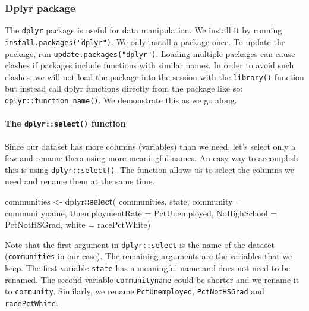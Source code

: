 \documentclass[]{article}
\newenvironment{Shaded}{\begin{snugshade}}{\end{snugshade}}
\newcommand{\DataTypeTok}[1]{\textcolor[rgb]{0.13,0.29,0.53}{#1}}
\newcommand{\KeywordTok}[1]{\textcolor[rgb]{0.13,0.29,0.53}{\textbf{#1}}}
\newcommand{\NormalTok}[1]{#1}
\newcommand{\OperatorTok}[1]{\textcolor[rgb]{0.81,0.36,0.00}{\textbf{#1}}}
\newcommand{\StringTok}[1]{\textcolor[rgb]{0.31,0.60,0.02}{#1}}
\let\oldparagraph\paragraph
\renewcommand{\paragraph}[1]{\oldparagraph{#1}\mbox{}}
\begin{document}
\hypertarget{dplyr-package}{%
\subsubsection{Dplyr package}\label{dplyr-package}}

The \texttt{dplyr} package is useful for data manipulation. We install it by running \texttt{install.packages("dplyr")}. We only install a package once. To update the package, run \texttt{update.packages("dplyr")}. Loading multiple packages can cause clashes if packages include functions with similar names. In order to avoid such clashes, we will not load the package into the session with the \texttt{library()} function but instead call dplyr functions directly from the package like so: \texttt{dplyr::function\_name()}. We demonstrate this as we go along.

\hypertarget{the-dplyrselect-function}{%
\paragraph{\texorpdfstring{The \texttt{dplyr::select()} function}{The dplyr::select() function}}\label{the-dplyrselect-function}}

Since our dataset has more columns (variables) than we need, let's select only a few and rename them using more meaningful names. An easy way to accomplish this is using \texttt{dplyr::select()}. The function allows us to select the columns we need and rename them at the same time.

\begin{Shaded}
\begin{Highlighting}[]
\NormalTok{communities <-}\StringTok{ }\NormalTok{dplyr}\OperatorTok{::}\KeywordTok{select}\NormalTok{(}
\NormalTok{  communities, }
\NormalTok{  state, }
  \DataTypeTok{community =}\NormalTok{ communityname, }
  \DataTypeTok{UnemploymentRate =}\NormalTok{ PctUnemployed, }
  \DataTypeTok{NoHighSchool =}\NormalTok{ PctNotHSGrad,}
  \DataTypeTok{white =}\NormalTok{ racePctWhite)}
\end{Highlighting}
\end{Shaded}

Note that the first argument in \texttt{dplyr::select} is the name of the dataset (\texttt{communities} in our case). The remaining arguments are the variables that we keep. The first variable \texttt{state} has a meaningful name and does not need to be renamed. The second variable \texttt{communityname} could be shorter and we rename it to \texttt{community}. Similarly, we rename \texttt{PctUnemployed}, \texttt{PctNotHSGrad} and \texttt{racePctWhite}.
\end{document}
